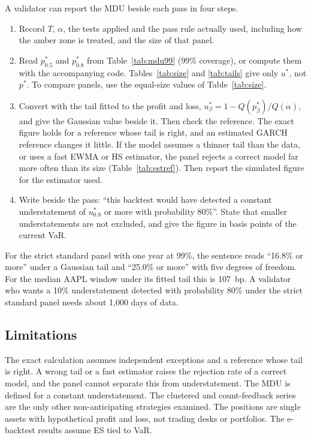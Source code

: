 \documentclass[11pt]{article}
\begin{document}
A validator can report the MDU beside each pass in four steps.
\begin{enumerate}\setlength{\itemsep}{2pt}
\item Record $T$, $\alpha$, the tests applied and the pass rule actually used,
including how the amber zone is treated, and the size of that panel.
\item Read $p^*_{0.5}$ and $p^*_{0.8}$ from Table~\ref{tab:mdu99} (99\%
coverage), or compute them with the accompanying code. Tables~\ref{tab:size}
and \ref{tab:tails} give only $u^*$, not $p^*$. To compare panels, use the
equal-size values of Table~\ref{tab:size}.
\item Convert with the tail fitted to the profit and loss, $u^*_\beta = 1 -
Q(p^*_\beta)/Q(\alpha)$, and give the Gaussian value beside it. Then check the
reference. The exact figure holds for a reference whose tail is right, and an
estimated GARCH reference changes it little. If the model assumes a thinner
tail than the data, or uses a fast EWMA or HS estimator, the panel rejects a
correct model far more often than its size (Table~\ref{tab:estref}). Then
report the simulated figure for the estimator used.
\item Write beside the pass: ``this backtest would have detected a constant
understatement of $u^*_{0.8}$ or more with probability 80\%''. State that smaller
understatements are not excluded, and give the figure in basis points of the
current VaR.
\end{enumerate}
For the strict standard panel with one year at 99\%, the sentence reads
``16.8\% or more'' under a Gaussian tail and ``25.0\% or more'' with five
degrees of freedom. For the median AAPL window under its fitted tail this is
107~bp. A validator who wants a 10\% understatement detected with probability 80\%
under the strict standard panel needs about 1,000 days of data.

\subsection{Limitations}

The exact calculation assumes independent exceptions and a reference whose
tail is right. A wrong tail or a fast estimator raises the rejection rate of a
correct model, and the panel cannot separate this from understatement. The MDU
is defined for a constant understatement. The clustered and count-feedback
series are the only other non-anticipating strategies examined. The positions
are single assets with hypothetical profit and loss, not trading desks or
portfolios. The e-backtest results assume ES tied to VaR.
\end{document}
